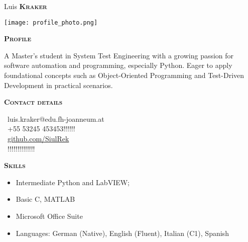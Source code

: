 \documentclass[11pt, a4paper]{article}
\newcommand{\headleft}[1]{\vspace*{3ex}\textsc{\textbf{#1}}\par%
    \vspace*{-1.5ex}\hrulefill\par\vspace*{0.7ex}}
\begin{document}
\setlength{\topskip}{0pt}
\setlength{\parindent}{0pt}
\setlength{\parskip}{0pt}
\setlength{\fboxsep}{0pt}
\pagestyle{empty}
\raggedbottom

\begin{minipage}[t]{0.33\textwidth} 
\colorbox{brown}{\begin{minipage}[t][5mm][t]{\textwidth}\null\hfill\null\end{minipage}}
\vspace{-.2ex} 
\colorbox{brown!90}{\color{white}
\textwidth\relax
\begin{minipage}[t][293mm][t]{0.805\textwidth\relax}
\raggedright
\vspace*{2.5ex}

\Large Luis \textbf{\textsc{Kraker}} \normalsize 

\null\hfill\texttt{[image: profile\_photo.png]}\hfill\null

\vspace*{0.5ex} %

\headleft{Profile}
A Master's student in System Test Engineering with a growing passion for software automation and programming, especially Python. Eager to apply foundational concepts such as Object-Oriented Programming and Test-Driven Development in practical scenarios.

\headleft{Contact details}
\small
\MVAt\ {\small luis.kraker@edu.fh-joanneum.at} \\[0.4ex]
\Mobilefone\ +55 53245 453453!!!!!! \\[0.5ex]
\Mundus\ \href{https://github.com/SiulRek}{github.com/SiulRek} \\[0.1ex]
\Letter\ !!!!!!!!!!!!!!
\normalsize

\headleft{Skills}
\begin{itemize}
\item Intermediate Python and LabVIEW; 
\item Basic C, MATLAB
\item Microsoft Office Suite
\item Languages: German (Native), English (Fluent), Italian (C1), Spanish
\end{itemize} 

\end{minipage}
\textwidth\relax
}
\end{minipage}
\end{document}
